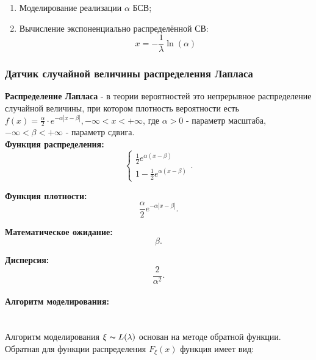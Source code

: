 \begin{enumerate}
	\item Моделирование реализации $\alpha$ БСВ;
	\item Вычисление экспоненциально распределённой СВ:
	      \begin{equation}
		      x = -\frac{1}{\lambda}\ln(\alpha)
	      \end{equation}
\end{enumerate}

\subsubsection{Датчик случайной величины распределения Лапласа}

\textbf{Распределение Лапласа} - в теории вероятностей это непрерывное распределение случайной величины, при котором плотность вероятности есть $f(x)=\frac{\alpha}{2} \cdot e^{-\alpha|x-\beta|}, -\infty < x < +\infty$, где $\alpha > 0$ - параметр масштаба, $-\infty < \beta < +\infty$ - параметр сдвига.\\

\textbf{Функция распределения:}
\begin{equation}
	\begin{cases}{}
		\frac{1}{2}e^{\alpha(x-\beta)}\\
		1-\frac{1}{2}e^{\alpha(x-\beta)}
	\end{cases}.
\end{equation}

\textbf{Функция плотности:}
\begin{equation}
	\frac{\alpha}{2}e^{-\alpha|x-\beta|}.
\end{equation}

\textbf{Математическое ожидание:}
\begin{equation}
	\beta.
\end{equation}

\textbf{Дисперсия:}
\begin{equation}
	\frac{2}{\alpha^{2}}.
\end{equation}

\paragraph{Алгоритм моделирования:}\
\\
Алгоритм моделирования $\xi \thicksim L(\lambda)$ основан на методе обратной функции. Обратная для функции распределения $F_{\xi}(x)$ функция имеет вид:

